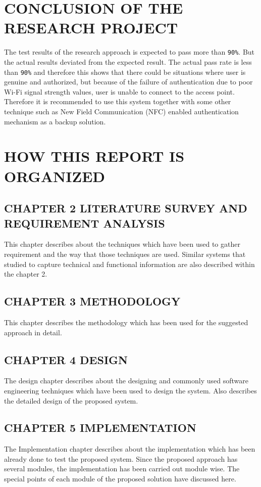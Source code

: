 \section{CONCLUSION OF THE RESEARCH PROJECT}
The test results of the research approach is expected to pass more than \verb|90%|. But the actual results deviated from the expected result. The actual pass rate is less than \verb|90%| and therefore this shows that there could be situations where user is genuine and authorized, but because of the failure of authentication due to poor Wi-Fi signal strength values, user is unable to connect to the access point. Therefore it is recommended to use this system together with some other technique such as New Field Communication (NFC) enabled authentication mechanism as a backup solution. 

\section{HOW THIS REPORT IS ORGANIZED}
\subsection{CHAPTER 2 LITERATURE SURVEY AND REQUIREMENT ANALYSIS}
This chapter describes about the techniques which have been used to gather requirement and the way that those techniques are used. Similar systems that studied to capture technical and functional information are also described within the chapter 2.

\subsection{CHAPTER 3 METHODOLOGY}
This chapter describes the methodology which has been used for the suggested approach in detail.

\subsection{CHAPTER 4 DESIGN}
The design chapter describes about the designing and commonly used software engineering techniques which have been used to design the system. Also describes the detailed design of the proposed system.

\subsection{CHAPTER 5 IMPLEMENTATION}
The Implementation chapter describes about the implementation which has been already done to test the proposed system. Since the proposed approach has several modules, the implementation has been carried out module wise. The special points of each module of the proposed solution  have discussed here.

